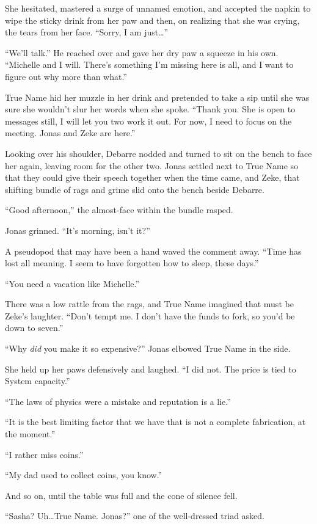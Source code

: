 She hesitated, mastered a surge of unnamed emotion, and accepted the napkin to wipe the sticky drink from her paw and then, on realizing that she was crying, the tears from her face. ``Sorry, I am just\ldots{}''

``We'll talk.'' He reached over and gave her dry paw a squeeze in his own. ``Michelle and I will. There's something I'm missing here is all, and I want to figure out why more than what.''

True Name hid her muzzle in her drink and pretended to take a sip until she was sure she wouldn't slur her words when she spoke. ``Thank you. She is open to messages still, I will let you two work it out. For now, I need to focus on the meeting. Jonas and Zeke are here.''

Looking over his shoulder, Debarre nodded and turned to sit on the bench to face her again, leaving room for the other two. Jonas settled next to True Name so that they could give their speech together when the time came, and Zeke, that shifting bundle of rags and grime slid onto the bench beside Debarre.

``Good afternoon,'' the almost-face within the bundle rasped.

Jonas grinned. ``It's morning, isn't it?''

A pseudopod that may have been a hand waved the comment away. ``Time has lost all meaning. I seem to have forgotten how to sleep, these days.''

``You need a vacation like Michelle.''

There was a low rattle from the rags, and True Name imagined that must be Zeke's laughter. ``Don't tempt me. I don't have the funds to fork, so you'd be down to seven.''

``Why \emph{did} you make it so expensive?'' Jonas elbowed True Name in the side.

She held up her paws defensively and laughed. ``I did not. The price is tied to System capacity.''

``The laws of physics were a mistake and reputation is a lie.''

``It is the best limiting factor that we have that is not a complete fabrication, at the moment.''

``I rather miss coins.''

``My dad used to collect coins, you know.''

And so on, until the table was full and the cone of silence fell.

``Sasha? Uh\ldots True Name. Jonas?'' one of the well-dressed triad asked.

